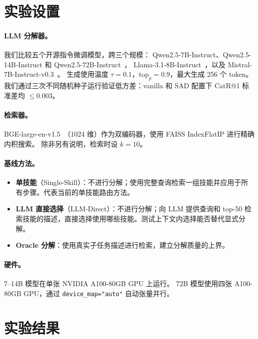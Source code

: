 \documentclass[11pt,a4paper]{ctexart}
\newcommand{\catrecall}{\text{CatR}}
\begin{document}
\section{实验设置}
\label{sec:setup}

\paragraph{LLM 分解器。}
我们比较五个开源指令微调模型，跨三个规模：
Qwen2.5-7B-Instruct、Qwen2.5-14B-Instruct 和 Qwen2.5-72B-Instruct~\citep{qwen2.5}，
Llama-3.1-8B-Instruct~\citep{dubey2024llama3}，以及
Mistral-7B-Instruct-v0.3~\citep{jiang2023mistral}。
生成使用温度 $\tau=0.1$，$\text{top}_p=0.9$，最大生成 256 个 token。
我们通过三次不同随机种子运行验证低方差：vanilla 和 SAD 配置下 $\catrecall$@1 标准差均 $\leq$0.003。

\paragraph{检索器。}
BGE-large-en-v1.5~\citep{xiao2023bge}（1024 维）作为双编码器，使用 FAISS IndexFlatIP 进行精确内积搜索。
除非另有说明，检索时设 $k=10$。

\paragraph{基线方法。}
\begin{itemize}[nosep,leftmargin=*]
  \item \textbf{单技能}（Single-Skill）：不进行分解；使用完整查询检索一组技能并应用于所有步骤。代表当前的单技能路由方法。
  \item \textbf{LLM 直接选择}（LLM-Direct）：不进行分解；向 LLM 提供查询和 top-50 检索技能的描述，直接选择使用哪些技能。测试上下文内选择能否替代显式分解。
  \item \textbf{Oracle 分解}：使用真实子任务描述进行检索，建立分解质量的上界。
\end{itemize}

\paragraph{硬件。}
7--14B 模型在单张 NVIDIA A100-80GB GPU 上运行。
72B 模型使用四张 A100-80GB GPU，通过 \texttt{device\_map="auto"} 自动张量并行。

\section{实验结果}
\label{sec:results}
\end{document}
